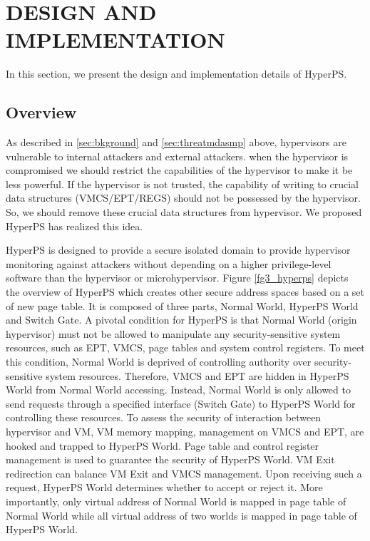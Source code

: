 \documentclass[10pt, numbers, preprint ]{sigplanconf}
\begin{document}
{\section{DESIGN AND IMPLEMENTATION} \label{sec:dsgnimplmt}
In this section, we present the design and implementation details of HyperPS.

\subsection{Overview} \label{subsec:overview}
As described in \ref{sec:bkground} and \ref{sec:threatmdasmp} above, hypervisors are vulnerable to internal attackers and external attackers. when the hypervisor is compromised we should restrict the capabilities of the hypervisor to make it be less powerful. If the hypervisor is not trusted, the capability of writing to crucial data structures (VMCS/EPT/REGS) should not be possessed by the hypervisor. So, we should remove these crucial data structures from hypervisor. We proposed HyperPS has realized this idea.

HyperPS is designed to provide a secure isolated domain to provide hypervisor monitoring against attackers without depending on a higher privilege-level software than the hypervisor or microhypervisor. Figure \ref{fg3_hyperps} depicts the overview of HyperPS which creates other secure address spaces based on a set of new page table. It is composed of three parts, Normal World, HyperPS World and Switch Gate. A pivotal condition for HyperPS is that Normal World (origin hypervisor) must not be allowed to manipulate any security-sensitive system resources, such as EPT, VMCS, page tables and system control registers. To meet this condition, Normal World is deprived of controlling authority over security-sensitive system resources. Therefore, VMCS and EPT are hidden in HyperPS World from Normal World accessing. Instead, Normal World is only allowed to send requests through a specified interface (Switch Gate) to HyperPS World for controlling these resources. To assess the security of interaction between hypervisor and VM, VM memory mapping, management on VMCS and EPT, are hooked and trapped to HyperPS World. Page table and control register management is used to guarantee the security of HyperPS World. VM Exit redirection can balance VM Exit and VMCS management. Upon receiving such a request, HyperPS World determines whether to accept or reject it. More importantly, only virtual address of Normal World is mapped in page table of Normal World while all virtual address of two worlds is mapped in page table of HyperPS World.

}
\end{document}
